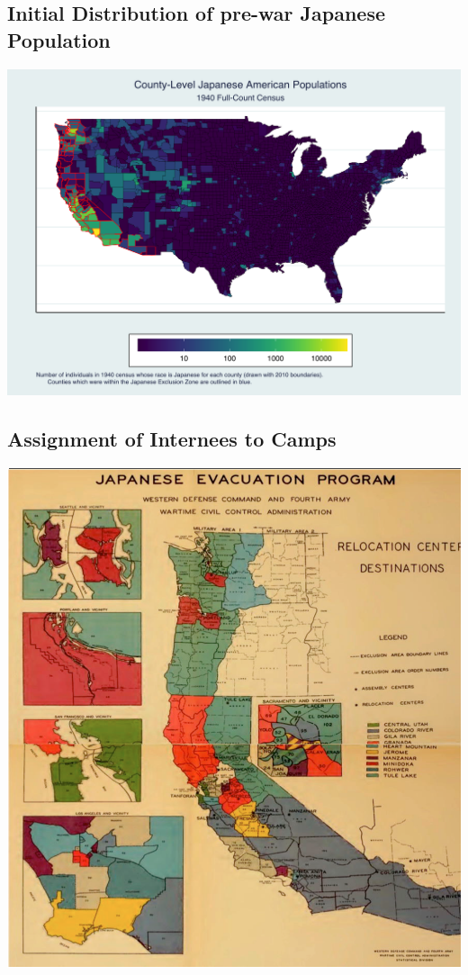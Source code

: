 \documentclass[12pt]{article}
\begin{document}
\subsection{Initial Distribution of pre-war Japanese
Population}\label{initial-distribution-of-pre-war-japanese-population}

\begin{center}
\includegraphics[width=1.0\textwidth]{figures/county_JAmap.png}
\end{center}

\subsection{Assignment of Internees to
Camps}\label{assignment-of-internees-to-camps}

\begin{center}
\includegraphics[width=1.0\textwidth]{figures/WRAzonesmap.png}
\end{center}
\end{document}
